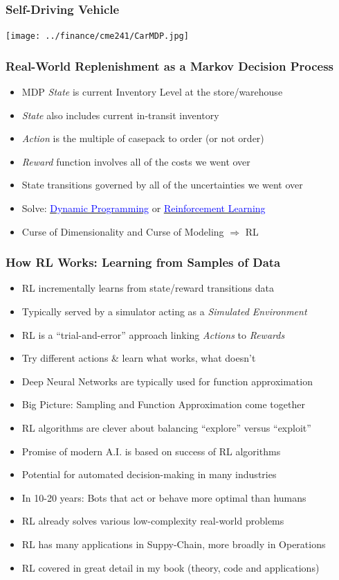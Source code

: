 \documentclass[handout]{beamer}
\begin{document}
\begin{frame}
\frametitle{Self-Driving Vehicle}
\texttt{[image: ../finance/cme241/CarMDP.jpg]}
\end{frame}

\begin{frame}
\frametitle{Real-World Replenishment as a Markov Decision Process}
\pause
\begin{itemize}[<+->]
\item MDP {\em State} is current Inventory Level at the store/warehouse
\item {\em State} also includes current in-transit inventory
\item {\em Action} is the multiple of casepack to order (or not order)
\item {\em Reward} function involves all of the costs we went over
\item State transitions governed by all of the uncertainties we went over
\item Solve: \href{https://en.wikipedia.org/wiki/Dynamic_programming}{\underline{\textcolor{blue}{Dynamic Programming}}} or
 \href{https://en.wikipedia.org/wiki/Reinforcement_learning}{\underline{\textcolor{blue}{Reinforcement Learning}}}
\item Curse of Dimensionality and Curse of Modeling $\Rightarrow$ RL
\end{itemize}
\end{frame}


\begin{frame}
\frametitle{How RL Works: Learning from Samples of Data}
\pause
\begin{itemize}[<+->]
\item RL incrementally learns from state/reward transitions data
\item Typically served by a simulator acting as a {\em Simulated Environment}
\item RL is a ``trial-and-error'' approach linking {\em Actions} to {\em Rewards}
\item Try different actions \& learn what works, what doesn't
\item Deep Neural Networks are typically used for function approximation
\item Big Picture: Sampling and Function Approximation come together
\item RL algorithms are clever about balancing  ``explore'' versus ``exploit''
\item Promise of modern A.I. is based on success of RL algorithms
\item Potential for automated decision-making in many industries
\item In 10-20 years: Bots that act or behave more optimal than humans
\item RL already solves various low-complexity real-world problems
\item RL has many applications in Suppy-Chain, more broadly in Operations
\item RL covered in great detail in my book (theory, code and applications)
\end{itemize}
\end{frame}
\end{document}
